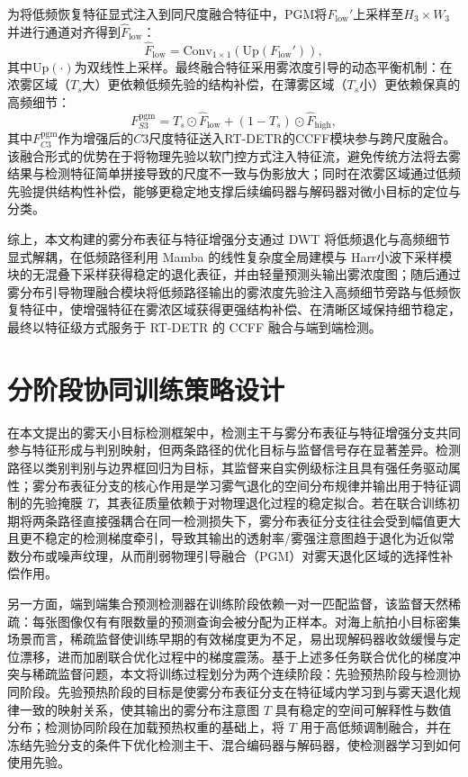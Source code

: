为将低频恢复特征显式注入到同尺度融合特征中，PGM将$F_{\mathrm{low}}'$上采样至$H_3\times W_3$并进行通道对齐得到$\hat{F}_{\mathrm{low}}$：
\begin{equation}
\hat{F}_{\mathrm{low}}=\mathrm{Conv}_{1\times1}\!\left(\mathrm{Up}(F_{\mathrm{low}}')\right),
\label{eq:pgm_low_up}
\end{equation}
其中$\mathrm{Up}(\cdot)$为双线性上采样。最终融合特征采用雾浓度引导的动态平衡机制：在浓雾区域（$T_s$大）更依赖低频先验的结构补偿，在薄雾区域（$T_s$小）更依赖保真的高频细节：
\begin{equation}
F_{S3}^{\mathrm{pgm}}=T_s\odot \hat{F}_{\mathrm{low}}+(1-T_s)\odot \hat{F}_{\mathrm{high}},
\label{eq:pgm_fuse}
\end{equation}
其中$F_{C3}^{\mathrm{pgm}}$作为增强后的$C3$尺度特征送入RT-DETR的CCFF模块参与跨尺度融合。该融合形式的优势在于将物理先验以软门控方式注入特征流，避免传统方法将去雾结果与检测特征简单拼接导致的尺度不一致与伪影放大；同时在浓雾区域通过低频先验提供结构性补偿，能够更稳定地支撑后续编码器与解码器对微小目标的定位与分类。

综上，本文构建的雾分布表征与特征增强分支通过 DWT 将低频退化与高频细节显式解耦，在低频路径利用 Mamba 的线性复杂度全局建模与 Harr小波下采样模块的无混叠下采样获得稳定的退化表征，并由轻量预测头输出雾浓度图；随后通过雾分布引导物理融合模块将低频路径输出的雾浓度先验注入高频细节旁路与低频恢复特征中，使增强特征在雾浓区域获得更强结构补偿、在清晰区域保持细节稳定，最终以特征级方式服务于 RT-DETR 的 CCFF 融合与端到端检测。

\section{分阶段协同训练策略设计}
\label{sec:training_strategy}

在本文提出的雾天小目标检测框架中，检测主干与雾分布表征与特征增强分支共同参与特征形成与判别映射，但两条路径的优化目标与监督信号存在显著差异。检测路径以类别判别与边界框回归为目标，其监督来自实例级标注且具有强任务驱动属性；雾分布表征分支的核心作用是学习雾气退化的空间分布规律并输出用于特征调制的先验掩膜 $T$，其表征质量依赖于对物理退化过程的稳定拟合。若在联合训练初期将两条路径直接强耦合在同一检测损失下，雾分布表征分支往往会受到幅值更大且更不稳定的检测梯度牵引，导致其输出的透射率/雾强注意图趋于退化为近似常数分布或噪声纹理，从而削弱物理引导融合（PGM）对雾天退化区域的选择性补偿作用。

另一方面，端到端集合预测检测器在训练阶段依赖一对一匹配监督，该监督天然稀疏：每张图像仅有有限数量的预测查询会被分配为正样本。对海上航拍小目标密集场景而言，稀疏监督使训练早期的有效梯度更为不足，易出现解码器收敛缓慢与定位漂移，进而加剧联合优化过程中的梯度震荡。基于上述多任务联合优化的梯度冲突与稀疏监督问题，本文将训练过程划分为两个连续阶段：先验预热阶段与检测协同阶段。先验预热阶段的目标是使雾分布表征分支在特征域内学习到与雾天退化规律一致的映射关系，使其输出的雾分布注意图 $T$ 具有稳定的空间可解释性与数值分布；检测协同阶段在加载预热权重的基础上，将 $T$ 用于高低频调制融合，并在冻结先验分支的条件下优化检测主干、混合编码器与解码器，使检测器学习到如何使用先验。

